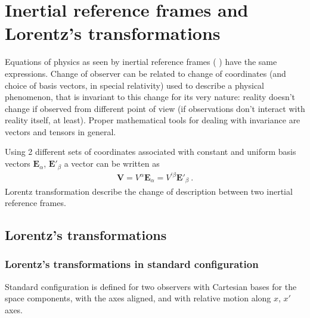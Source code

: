 \documentclass[letterpaper,10pt,english]{jupyterBook}
\begin{document}
\chapter{Inertial reference frames and Lorentz’s transformations}
\label{\detokenize{ch/relativity-special/lorentz:inertial-reference-frames-and-lorentz-s-transformations}}\label{\detokenize{ch/relativity-special/lorentz:relativity-special-lorentz}}\label{\detokenize{ch/relativity-special/lorentz::doc}}
\sphinxAtStartPar
Equations of physics as seen by inertial reference frames ( ) have the same expressions. Change of observer can be related to change of coordinates (and choice of basis vectors, in special relativity) used to describe a physical phenomenon, that is invariant to this change for its very nature: reality doesn’t change if observed from different point of view (if observations don’t interact with reality itself, at least). Proper mathematical tools for dealing with invariance are vectors and tensors in general.

\sphinxAtStartPar
Using 2 different sets of coordinates associated with constant and uniform basis vectors \(\mathbf{E}_{\alpha}\), \(\mathbf{E}'_{\beta}\) a vector can be written as
\begin{equation*}
\begin{split}\mathbf{V} = V^{\alpha} \mathbf{E}_{\alpha} = V^{'\beta} \mathbf{E}'_{\beta} \ . \end{split}
\end{equation*}
\sphinxAtStartPar
Lorentz transformation describe the change of description between two inertial reference frames.


\section{Lorentz’s transformations}
\label{\detokenize{ch/relativity-special/lorentz:lorentz-s-transformations}}\label{\detokenize{ch/relativity-special/lorentz:relativity-special-lorentz-transformation}}

\subsection{Lorentz’s transformations in standard configuration}
\label{\detokenize{ch/relativity-special/lorentz:lorentz-s-transformations-in-standard-configuration}}\label{\detokenize{ch/relativity-special/lorentz:relativity-special-lorentz-transformation-std}}
\sphinxAtStartPar
Standard configuration is defined for two observers with Cartesian bases for the space components, with the axes aligned, and with relative motion along \(x\), \(x'\) axes.
\end{document}
